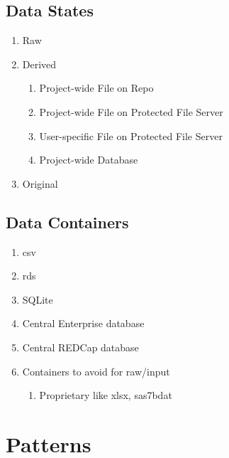 \documentclass[]{book}
\providecommand{\tightlist}{%
  \setlength{\itemsep}{0pt}\setlength{\parskip}{0pt}}
\begin{document}
\hypertarget{data-states}{%
\section{Data States}\label{data-states}}

\begin{enumerate}
\def\labelenumi{\arabic{enumi}.}
\tightlist
\item
  Raw
\item
  Derived

  \begin{enumerate}
  \def\labelenumii{\arabic{enumii}.}
  \tightlist
  \item
    Project-wide File on Repo
  \item
    Project-wide File on Protected File Server
  \item
    User-specific File on Protected File Server
  \item
    Project-wide Database
  \end{enumerate}
\item
  Original
\end{enumerate}

\hypertarget{data-containers}{%
\section{Data Containers}\label{data-containers}}

\begin{enumerate}
\def\labelenumi{\arabic{enumi}.}
\tightlist
\item
  csv
\item
  rds
\item
  SQLite
\item
  Central Enterprise database
\item
  Central REDCap database
\item
  Containers to avoid for raw/input

  \begin{enumerate}
  \def\labelenumii{\arabic{enumii}.}
  \tightlist
  \item
    Proprietary like xlsx, sas7bdat
  \end{enumerate}
\end{enumerate}

\hypertarget{patterns}{%
\chapter{Patterns}\label{patterns}}
\end{document}
